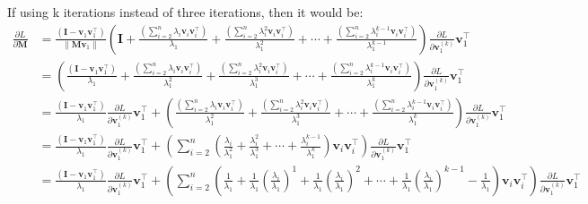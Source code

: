 \documentclass{article}
\newcommand{\bM}{\mathbf{M}}
\newcommand{\bv}{\mathbf{v}}
\newcommand{\bI}{\mathbf{I}}
\begin{document}
	If using k iterations instead of three iterations, then it would be:
	\begin{equation}
	\begin{aligned}
	\frac{\partial L}{\partial \bM}
	&= \frac{\left(\bI-\bv_{1} \bv_{1}^{\top}\right)}{\left\|\bM \bv_{1}\right\|}
	\left(\bI +
	\frac{\left(\sum_{i=2}^{n}\lambda_{i}\bv_{i}\bv_{i}^{\top}\right)}{ \lambda_{1}}  + 
	\frac{\left(\sum_{i=2}^{n}\lambda_{i}^{2}\bv_{i}\bv_{i}^{\top}\right)}{\lambda_{1}^{2}} + \cdots +
	\frac{\left(\sum_{i=2}^{n}\lambda_{i}^{k-1}\bv_{i}\bv_{i}^{\top}\right)}{\lambda_{1}^{k-1}}  
	\right)\frac{\partial L}{\partial \bv_{1}^{(k)}}\bv_{1}^{\top}\\
	&=\left(\frac{\left(\bI-\bv_{1} \bv_{1}^{\top}\right)}{\lambda_{1}} +
	\frac{\left(\sum_{i=2}^{n}\lambda_{i}\bv_{i}\bv_{i}^{\top}\right)}{ \lambda_{1}^{2}}  + 
	\frac{\left(\sum_{i=2}^{n}\lambda_{i}^{2}\bv_{i}\bv_{i}^{\top}\right)}{\lambda_{1}^{3}} + \cdots +
	\frac{\left(\sum_{i=2}^{n}\lambda_{i}^{k-1}\bv_{i}\bv_{i}^{\top}\right)}{\lambda_{1}^{k}}  
	\right)\frac{\partial L}{\partial \bv_{1}^{(k)}}\bv_{1}^{\top}\\
	&=\frac{\left(\bI-\bv_{1} \bv_{1}^{\top}\right)}{\lambda_{1}} \frac{\partial L}{\partial \bv_{1}^{(k)}}\bv_{1}^{\top} +
	\left(
	\frac{\left(\sum_{i=2}^{n}\lambda_{i}\bv_{i}\bv_{i}^{\top}\right)}{ \lambda_{1}^{2}}  + 
	\frac{\left(\sum_{i=2}^{n}\lambda_{i}^{2}\bv_{i}\bv_{i}^{\top}\right)}{\lambda_{1}^{3}} + \cdots +
	\frac{\left(\sum_{i=2}^{n}\lambda_{i}^{k-1}\bv_{i}\bv_{i}^{\top}\right)}{\lambda_{1}^{k}}  
	\right)\frac{\partial L}{\partial \bv_{1}^{(k)}}\bv_{1}^{\top}\\
	&=\frac{\left(\bI-\bv_{1} \bv_{1}^{\top}\right)}{\lambda_{1}} \frac{\partial L}{\partial \bv_{1}^{(k)}}\bv_{1}^{\top} +
	\left(\sum_{i=2}^{n}\left(\frac{\lambda_{i}}{\lambda_{1}^{2}} + 
	\frac{\lambda_{i}^{2}}{\lambda_{1}^{3}} + \cdots + \frac{\lambda_{i}^{k-1}}{\lambda_{1}^{k}}
	\right)\bv_{i}\bv_{i}^{\top}
	\right)\frac{\partial L}{\partial \bv_{1}^{(k)}}\bv_{1}^{\top}\\
	&=\frac{\left(\bI-\bv_{1} \bv_{1}^{\top}\right)}{\lambda_{1}} \frac{\partial L}{\partial \bv_{1}^{(k)}}\bv_{1}^{\top} +
	\left(\sum_{i=2}^{n}\left(
	\frac{1}{\lambda_{1}} +
	\frac{1}{\lambda_{1}}\left(\frac{\lambda_{i}}{\lambda_{1}}\right)^{1} +
	\frac{1}{\lambda_{1}}\left(\frac{\lambda_{i}}{\lambda_{1}}\right)^{2} + \cdots +
	\frac{1}{\lambda_{1}}\left(\frac{\lambda_{i}}{\lambda_{1}}\right)^{k-1}
	- \frac{1}{\lambda_{1}}
	\right)\bv_{i}\bv_{i}^{\top}
	\right)\frac{\partial L}{\partial \bv_{1}^{(k)}}\bv_{1}^{\top}\\
	\end{aligned}
	\label{eq: geo-prog-series}
	\end{equation}
\end{document}
